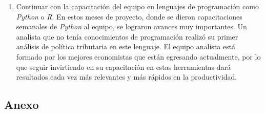 \documentclass[a4paper, 11pt]{article}
\begin{document}
\begin{enumerate}
\begin{enumerate}
		\item Continuar con la capacitación del equipo en lenguajes de programación como \textit{Python} o \textit{R}. En estos meses de proyecto, donde se dieron capacitaciones semanales de \textit{Python} al equipo, se lograron avances muy importantes. Un analista que no tenía conocimientos de programación realizó su primer análisis de política tributaria en este lenguaje. El equipo analista está formado por los mejores economistas que están egresando actualmente, por lo que seguir invirtiendo en su capacitación en estas herramientas dará resultados cada vez más relevantes y más rápidos en la productividad.
\end{enumerate}
\end{enumerate}
\begin{landscape}
\section*{Anexo}


\end{landscape}
\end{document}
